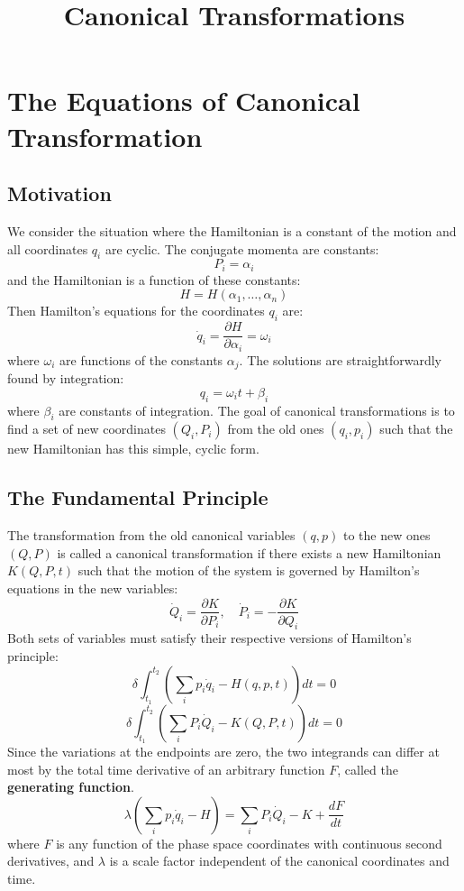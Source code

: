 \documentclass[12pt]{article}
\title{\textbf{Canonical Transformations}}
\author{}
\date{}
\begin{document}
	\maketitle
	\tableofcontents
	\newpage
	
	\section{The Equations of Canonical Transformation}
	
	\subsection{Motivation}
	We consider the situation where the Hamiltonian is a constant of the motion and all coordinates $q_i$ are cyclic. The conjugate momenta are constants:
	$$
	P_i = \alpha_i
	$$
	and the Hamiltonian is a function of these constants:
	$$
	H = H(\alpha_1, \dots, \alpha_n)
	$$
	Then Hamilton's equations for the coordinates $q_i$ are:
	$$
	\dot{q}_i = \frac{\partial H}{\partial \alpha_i} = \omega_i
	$$
	where $\omega_i$ are functions of the constants $\alpha_j$. The solutions are straightforwardly found by integration:
	$$
	q_i = \omega_i t + \beta_i
	$$
	where $\beta_i$ are constants of integration. The goal of canonical transformations is to find a set of new coordinates $(Q_i, P_i)$ from the old ones $(q_i, p_i)$ such that the new Hamiltonian has this simple, cyclic form.
	
	\subsection{The Fundamental Principle}
	The transformation from the old canonical variables $(q, p)$ to the new ones $(Q, P)$ is called a canonical transformation if there exists a new Hamiltonian $K(Q, P, t)$ such that the motion of the system is governed by Hamilton's equations in the new variables:
	$$
	\dot{Q}_i = \frac{\partial K}{\partial P_i}, \quad \dot{P}_i = -\frac{\partial K}{\partial Q_i}
	$$
	Both sets of variables must satisfy their respective versions of Hamilton's principle:
	$$
	\delta \int_{t_1}^{t_2} \left( \sum_i p_i \dot{q}_i - H(q, p, t) \right) dt = 0
	$$
	$$
	\delta \int_{t_1}^{t_2} \left( \sum_i P_i \dot{Q}_i - K(Q, P, t) \right) dt = 0
	$$
	Since the variations at the endpoints are zero, the two integrands can differ at most by the total time derivative of an arbitrary function $F$, called the \textbf{generating function}.
	$$
	\lambda \left( \sum_i p_i \dot{q}_i - H \right) = \sum_i P_i \dot{Q}_i - K + \frac{dF}{dt}
	$$
	where $F$ is any function of the phase space coordinates with continuous second derivatives, and $\lambda$ is a scale factor independent of the canonical coordinates and time.
	
\end{document}

